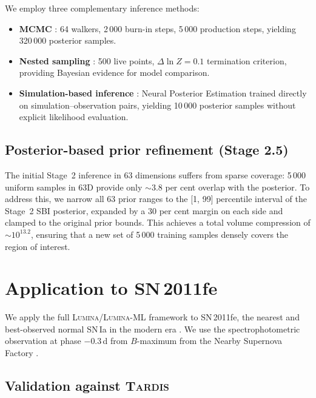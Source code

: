 \documentclass[fleqn,usenatbib]{mnras}
\newcommand{\lumina}{\textsc{Lumina}}
\newcommand{\luminaml}{\textsc{Lumina-ML}}
\newcommand{\tardis}{\textsc{Tardis}}
\begin{document}
We employ three complementary inference methods:
\begin{itemize}
    \item \textbf{MCMC} \citep{emcee2013}: 64 walkers, 2\,000 burn-in steps, 5\,000 production steps, yielding 320\,000 posterior samples.
    \item \textbf{Nested sampling} \citep{dynesty2020}: 500 live points, $\Delta\ln Z = 0.1$ termination criterion, providing Bayesian evidence for model comparison.
    \item \textbf{Simulation-based inference} \citep[SBI;][]{cranmer2020}: Neural Posterior Estimation \citep[NPE;][]{papamakarios2021} trained directly on simulation--observation pairs, yielding 10\,000 posterior samples without explicit likelihood evaluation.
\end{itemize}

\subsection{Posterior-based prior refinement (Stage 2.5)}
\label{sec:stage25}

The initial Stage~2 inference in 63 dimensions suffers from sparse coverage: 5\,000 uniform samples in 63D provide only ${\sim}3.8$ per cent overlap with the posterior. To address this, we narrow all 63 prior ranges to the [1, 99] percentile interval of the Stage~2 SBI posterior, expanded by a 30 per cent margin on each side and clamped to the original prior bounds. This achieves a total volume compression of ${\sim}10^{13.2}$, ensuring that a new set of 5\,000 training samples densely covers the region of interest.


\section{Application to SN\,2011fe}
\label{sec:results}

We apply the full \lumina{}/\luminaml{} framework to SN\,2011fe, the nearest and best-observed normal SN\,Ia in the modern era \citep{nugent2011}. We use the spectrophotometric observation at phase $-0.3$\,d from $B$-maximum from the Nearby Supernova Factory \citep{pereira2013}.

\subsection{Validation against \tardis{}}
\label{sec:validation}
\end{document}
